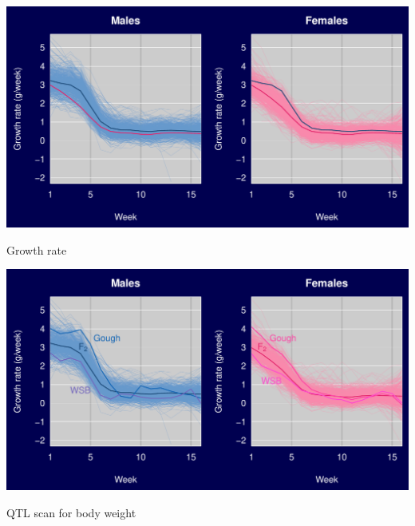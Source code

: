 \documentclass[12pt]{article}
\newcommand{\headsize}{\fontsize{35}{35} \selectfont}
\begin{document}
\vspace{30mm}

\centerline{\includegraphics{Figs/rate2.pdf}}


\newpage

\addtocounter{page}{-1}

\headsize \color{myyellow}
\hfill \begin{minipage}{5.75in}
\centering
Growth rate
\end{minipage}

\vspace{30mm}

\centerline{\includegraphics{Figs/rate3.pdf}}



\newpage

\headsize \color{myyellow}
\hfill \begin{minipage}{5.75in}
\centering
QTL scan for body weight
\end{minipage}

\vspace{5mm}
\end{document}
